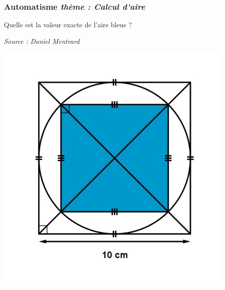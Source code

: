 \documentclass[11pt]{beamer}
\newcounter{autocompteur}
\newcommand{\automatisme}[1]{\addtocounter{autocompteur}{1}\frametitle{Automatisme  \theautocompteur  \textit{ thème : #1}}}
\begin{document}
\begin{frame}
\automatisme{Calcul d'aire}
Quelle est la valeur exacte de l'aire bleue ?

{\small \textit{Source : Daniel Mentrard}}

\begin{center}
\includegraphics[scale=0.25]{ressources/blue_area_2023-02-28.jpeg}
\end{center}

\end{frame}
\end{document}
